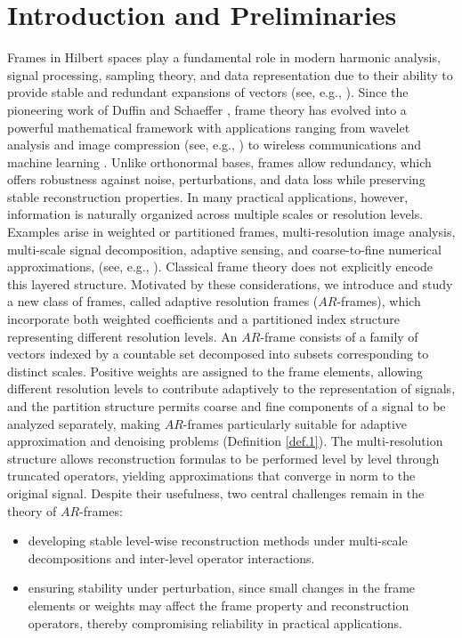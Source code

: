 \documentclass[12pt,titlepage]{amsart}
\theoremstyle{definition}
\theoremstyle{remark}
\begin{document}
\section{\textbf{Introduction and Preliminaries}}\label{Sec1}
Frames in Hilbert spaces play a fundamental role in modern
harmonic analysis, signal processing, sampling theory, and data
representation due to their ability to provide stable and
redundant expansions of vectors (see, e.g.,
\cite{Benedetto.1995,Christensen.2023,Eldar.2012,Heil.2011}).
Since the pioneering work of Duffin and Schaeffer
\cite{Duffin.1952}, frame theory has evolved into a powerful
mathematical framework with applications ranging from wavelet
analysis and image compression (see, e.g.,
\cite{Benedetto.1998,Meyer.1997}) to wireless communications and
machine learning \cite{Rajupillai.2019,Strohmer.2001}. Unlike
orthonormal bases, frames allow redundancy, which offers
robustness against noise, perturbations, and data loss while
preserving stable reconstruction properties. In many practical
applications, however, information is naturally organized across
multiple scales or resolution levels. Examples arise in weighted
or partitioned frames, multi-resolution image analysis,
multi-scale signal decomposition, adaptive sensing, and
coarse-to-fine numerical approximations, (see, e.g.,
\cite{Balazs.2010,Balazs.2026,Cai.2012,Mallat.1999}). Classical
frame theory does not explicitly encode this layered structure.
Motivated by these considerations, we introduce and study a new
class of frames, called adaptive resolution frames ($AR$-frames),
which incorporate both weighted coefficients and a partitioned
index structure representing different resolution levels. An
$AR$-frame consists of a family of vectors indexed by a countable
set decomposed into subsets corresponding to distinct scales.
Positive weights are assigned to the frame elements, allowing
different resolution levels to contribute adaptively to the
representation of signals, and the partition structure permits
coarse and fine components of a signal to be analyzed separately,
making $AR$-frames particularly suitable for adaptive
approximation and denoising problems (Definition \ref{def.1}). The
multi-resolution structure allows reconstruction formulas to be
performed level by level through truncated operators, yielding
approximations that converge in norm to the original signal.
Despite their usefulness, two central challenges remain in the
theory of $AR$-frames:
\begin{itemize}
\item[(i)] developing stable level-wise reconstruction methods
under multi-scale decompositions and inter-level operator
interactions. \item[(ii)] ensuring stability under perturbation,
since small changes in the frame elements or weights may affect
the frame property and reconstruction operators, thereby
compromising reliability in practical applications.
\end{itemize}
\end{document}
